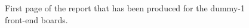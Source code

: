 \begin{figure}[ht]
    \centering
    \caption{First page of the report that has been produced for the dummy-1 front-end boards.}
    \label{figDUMMYreport}
\end{figure}

